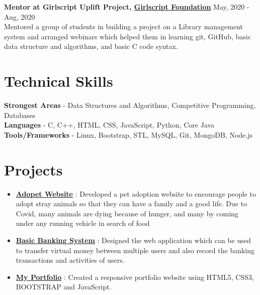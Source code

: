 \documentclass[margin, centered]{res}
\begin{document}
\begin{resume}
\textbf{Mentor at Girlscript Uplift Project, \href{https://drive.google.com/file/d/1-HEx-n0SeThN8SUmXoDLzdNj-KmQgGuv/view?usp=sharing}{Girlscript Foundation}} \hfill May, 2020 - Aug, 2020 \\
  Mentored a group of students in building a project on a Library management system and arranged webinars which helped them in learning git, GitHub, basic data structure and algorithms, and basic C code syntax.   
\section{Technical \hspace{2mm} Skills}
\textbf{Strongest Areas} - Data Structures and Algorithms, Competitive Programming, Databases \\
\textbf{Languages} - C, C++, HTML, CSS, JavaScript, Python, Core Java  \\
\textbf{Tools/Frameworks} - Linux, Bootstrap, STL, MySQL, Git, MongoDB, Node.js

\section{Projects}
\begin{itemize}[leftmargin=*]
  \item \textbf{\href{https://github.com/tannuchoudhary/basic_banking_system}{Adopet Website}} : Developed a pet adoption website to encourage people to adopt stray animals so that they can have a family and a good life. Due to Covid, many animals are dying because of hunger, and many by coming under any running vehicle in search of food
 \item \textbf{\href{https://github.com/tannuchoudhary/basic_banking_system}{Basic Banking System}} : Designed the web application which can be used to transfer virtual money between multiple users and also record the banking transactions and activities of users.
  \item \textbf{\href{https://tannuchoudhary.github.io/My-Portfolio/}{My Portfolio}} : Created a responsive portfolio website using HTML5, CSS3, BOOTSTRAP and JavaScript.
  

\end{itemize}
\end{resume}
\end{document}
